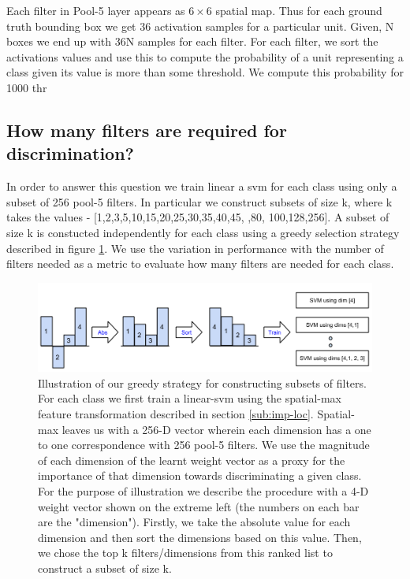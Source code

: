 \documentclass[runningheads]{llncs}
\begin{document}
Each filter in Pool-5 layer appears as $6 \times 6$ spatial map. Thus for each ground truth bounding box we get 36 activation samples for a particular unit. Given, N boxes we end up with 36N samples for each filter. For each filter, we sort the activations values and use this to compute the probability of a unit representing a class given its value is more than some threshold. We compute this probability for 1000 thr


\subsection{How many filters are required for discrimination?}
\label{sub:how-many}
In order to answer this question we train linear a svm for each class using only a subset of 256 pool-5 filters. In particular we construct subsets of size k, where k takes the values - [1,2,3,5,10,15,20,25,30,35,40,45, ,80, 100,128,256]. A subset of size k is constucted independently for each class using a greedy selection strategy described in figure \ref{fig:sel-strategy}. We use the variation in performance with the number of filters needed as a metric to evaluate how many filters are needed for each class. 
  
\begin{figure}
\centering
\includegraphics[scale=0.30]{images/how-many.png}
\caption{Illustration of our greedy strategy for constructing subsets of filters. For each class we first train a linear-svm using the spatial-max feature transformation described in section \ref{sub:imp-loc}. Spatial-max leaves us with a 256-D vector wherein each dimension has a one to one correspondence with 256 pool-5 filters. We use the magnitude of each dimension of the learnt weight vector as a proxy for the importance of that dimension towards discriminating a given class. For the purpose of illustration we describe the procedure with a 4-D weight vector shown on the extreme left (the numbers on each bar are the "dimension"). Firstly, we take the absolute value for each dimension and then sort the dimensions based on this value. Then, we chose the top k filters/dimensions from this ranked list to construct a subset of size k.}
\label{fig:sel-strategy}
\end{figure}
\end{document}
